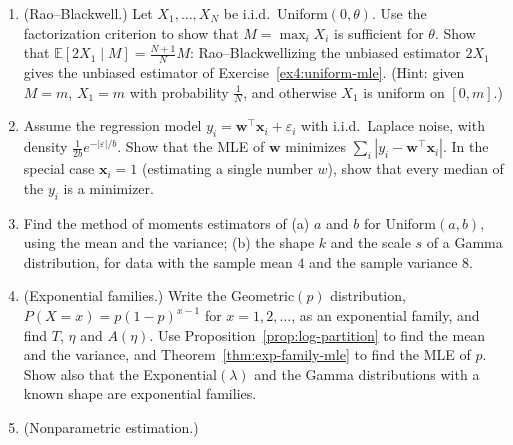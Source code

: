\documentclass[11pt]{article}
\newcommand{\E}{\mathbb{E}}
\theoremstyle{definition}
\theoremstyle{plain}
\theoremstyle{remark}
\begin{document}
\begin{enumerate}[leftmargin=*]
\begin{enumerate}[label=(\alph*)]
        \item Show that $I(\lambda) = \frac{1}{\lambda^2}$ for Exponential$(\lambda)$. The sum $S$ of $N \geq 3$ i.i.d.\ Exponential$(\lambda)$ variables has the Gamma density $\frac{\lambda^N s^{N-1}e^{-\lambda s}}{(N - 1)!}$ for $s > 0$. Use it to show that the MLE $\frac{1}{\bar X_N}$ has the expectation $\frac{N\lambda}{N - 1}$, that $\frac{N - 1}{N\bar X_N}$ is unbiased, and that its variance $\frac{\lambda^2}{N - 2}$ is larger than the Cram\'er--Rao bound. Is the MLE asymptotically efficient?
        \item Counts of $N = 50$ independent Poisson observations have the sample mean $3$. Estimate the standard error of $\hat\lambda$ from the observed information $-\ell''(\hat\lambda)$, and give an approximate $95\%$ confidence interval for $\lambda$.
    \end{enumerate}
    \item (Rao--Blackwell.) Let $X_1, \ldots, X_N$ be i.i.d.\ Uniform$(0, \theta)$. Use the factorization criterion to show that $M = \max_i X_i$ is sufficient for $\theta$. Show that $\E[2X_1 \mid M] = \frac{N + 1}{N}M$: Rao--Blackwellizing the unbiased estimator $2X_1$ gives the unbiased estimator of Exercise~\ref{ex4:uniform-mle}. (Hint: given $M = m$, $X_1 = m$ with probability $\frac{1}{N}$, and otherwise $X_1$ is uniform on $[0, m]$.)
    \item Assume the regression model $y_i = \mathbf{w}^\top\mathbf{x}_i + \varepsilon_i$ with i.i.d.\ Laplace noise, with density $\frac{1}{2b}e^{-|\varepsilon|/b}$. Show that the MLE of $\mathbf{w}$ minimizes $\sum_i |y_i - \mathbf{w}^\top\mathbf{x}_i|$. In the special case $\mathbf{x}_i = 1$ (estimating a single number $w$), show that every median of the $y_i$ is a minimizer.
    \item Find the method of moments estimators of (a) $a$ and $b$ for Uniform$(a, b)$, using the mean and the variance; (b) the shape $k$ and the scale $s$ of a Gamma distribution, for data with the sample mean $4$ and the sample variance $8$.
    \item (Exponential families.) Write the Geometric$(p)$ distribution, $P(X = x) = p(1 - p)^{x - 1}$ for $x = 1, 2, \ldots$, as an exponential family, and find $T$, $\eta$ and $A(\eta)$. Use Proposition~\ref{prop:log-partition} to find the mean and the variance, and Theorem~\ref{thm:exp-family-mle} to find the MLE of $p$. Show also that the Exponential$(\lambda)$ and the Gamma distributions with a known shape are exponential families.
    \item (Nonparametric estimation.)

\end{enumerate}
\end{document}

